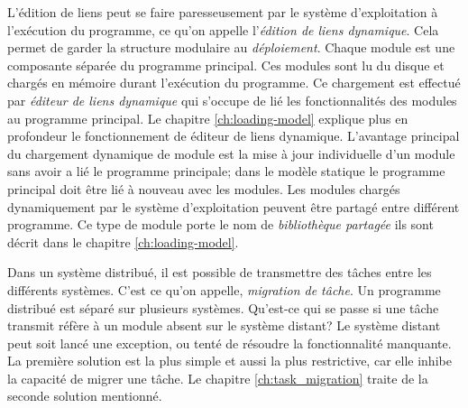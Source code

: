 L'édition de liens peut se faire paresseusement par le système d'exploitation à
l'exécution du programme, ce qu'on appelle l'\textit{édition de liens dynamique}.  Cela
permet de garder la structure modulaire au \textit{déploiement}.
Chaque module est une composante séparée du programme principal.  Ces modules
sont lu du disque et chargés en mémoire durant l'exécution du programme.  Ce
chargement est effectué par \textit{éditeur de liens dynamique} qui s'occupe de
lié les fonctionnalités des modules au programme principal. Le chapitre %
\ref{ch:loading-model} explique plus en profondeur le fonctionnement de éditeur de liens
dynamique. L'avantage principal du chargement dynamique de module est la mise à jour
individuelle d'un module sans avoir a lié le programme principale; dans le
modèle statique le programme principal doit être lié à nouveau avec les modules.
Les modules chargés dynamiquement par le système d'exploitation peuvent être partagé entre différent
programme. Ce type de module porte le nom de \textit{bibliothèque partagée} ils sont décrit dans
le chapitre \ref{ch:loading-model}.


Dans un système distribué, il est possible de transmettre des tâches entre les
différents systèmes. C'est ce qu'on appelle, \textit{migration de tâche}.  Un
programme distribué est séparé sur plusieurs systèmes. Qu'est-ce qui se passe
si une tâche transmit réfère à un module absent sur le système distant?  Le
système distant peut soit lancé une exception, ou tenté de résoudre la
fonctionnalité manquante. La première solution est la plus simple et aussi la
plus restrictive, car elle inhibe la capacité de migrer une tâche. Le chapitre
\ref{ch:task_migration} traite de la seconde solution mentionné.



